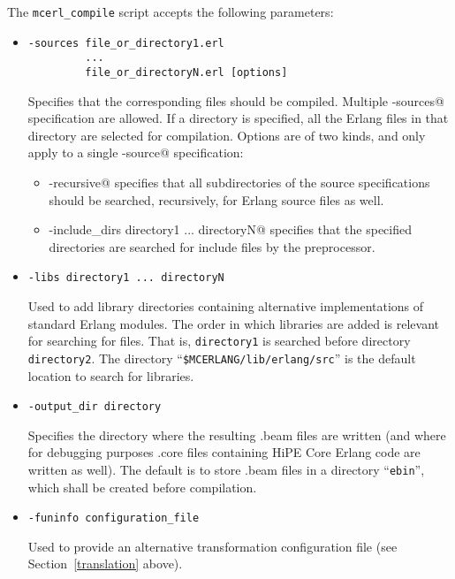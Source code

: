\documentclass[a4paper]{article}
\begin{document}
The \texttt{mcerl\_compile} script accepts the following parameters:
\begin{itemize}
\item
\begin{lstlisting}
-sources file_or_directory1.erl 
         ... 
         file_or_directoryN.erl [options]
\end{lstlisting}
Specifies that the corresponding files should be compiled.
Multiple \lstinline@-sources@ 
specification are allowed.
If a directory is specified, all the Erlang files in that directory
are selected for compilation.
Options are of two kinds, and only apply to a single 
\lstinline@-source@
specification: 
\begin{itemize}
\item
\lstinline@-recursive@ specifies that 
all subdirectories
of the source specifications should be searched, recursively,
for Erlang source files as well.
\item
\lstinline@-include_dirs directory1 ... directoryN@ 
specifies that the specified directories are searched for include files
by the preprocessor.
\end{itemize}

\item
\begin{lstlisting}
-libs directory1 ... directoryN
\end{lstlisting}
Used to add library directories containing
alternative implementations of standard
Erlang modules. The order in which libraries are added is relevant
for searching for files. That is, \texttt{directory1} is searched
before directory \texttt{directory2}.
The directory ``\texttt{\$MCERLANG/lib/erlang/src}''
is the default location to search for libraries.

\item
\begin{lstlisting}
-output_dir directory
\end{lstlisting}
Specifies the directory where the resulting
.beam files are written (and where for debugging purposes .core files
containing HiPE Core Erlang code are written as well).
The default is to store .beam files in a directory ``\texttt{ebin}'', which shall be created before compilation.

\item
\begin{lstlisting}
-funinfo configuration_file
\end{lstlisting}
Used to provide an alternative transformation configuration file
(see Section~\ref{translation} above).


\end{itemize}
\end{document}
